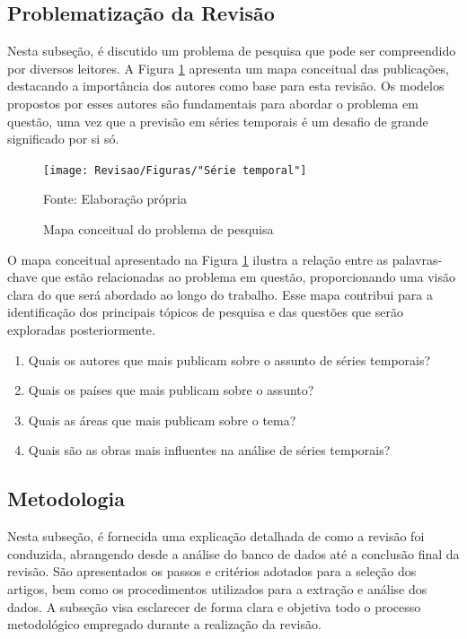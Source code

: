 \subsection{Problematiza\c c\~ao da Revis\~ao} \label{subsec: problematização da revisão}

Nesta subseção, é discutido um problema de pesquisa que pode ser compreendido por diversos leitores. A Figura \ref{fig:serie-temporal} apresenta um mapa conceitual das publicações, destacando a importância dos autores como base para esta revisão. Os modelos propostos por esses autores são fundamentais para abordar o problema em questão, uma vez que a previsão em séries temporais é um desafio de grande significado por si só.

\begin{figure}[H]
	\centering
	\caption{Mapa conceitual do problema de pesquisa}
	\label{fig:serie-temporal}
	\texttt{[image: Revisao/Figuras/"Série temporal"]}
	
	Fonte: Elaboração própria 
\end{figure}

O mapa conceitual apresentado na Figura \ref{fig:serie-temporal} ilustra a relação entre as palavras-chave que estão relacionadas ao problema em questão, proporcionando uma visão clara do que será abordado ao longo do trabalho. Esse mapa contribui para a identificação dos principais tópicos de pesquisa e das questões que serão exploradas posteriormente.

\begin{enumerate}[start=1, label = {\textbf{Q} \arabic* } ]
	\item \label{questão:rev1}Quais os autores que mais publicam sobre o assunto de séries temporais?
	\item \label{questão:rev2}Quais os países que mais publicam sobre o assunto? 
	\item \label{questão:rev3}Quais as áreas que mais publicam sobre o tema?
	\item \label{questão:rev4}Quais são as obras mais influentes na análise de séries temporais?
\end{enumerate}

\subsection{Metodologia}\label{subsec:met da revisão}

Nesta subseção, é fornecida uma explicação detalhada de como a revisão foi conduzida, abrangendo desde a análise do banco de dados até a conclusão final da revisão. São apresentados os passos e critérios adotados para a seleção dos artigos, bem como os procedimentos utilizados para a extração e análise dos dados. A subseção visa esclarecer de forma clara e objetiva todo o processo metodológico empregado durante a realização da revisão.

